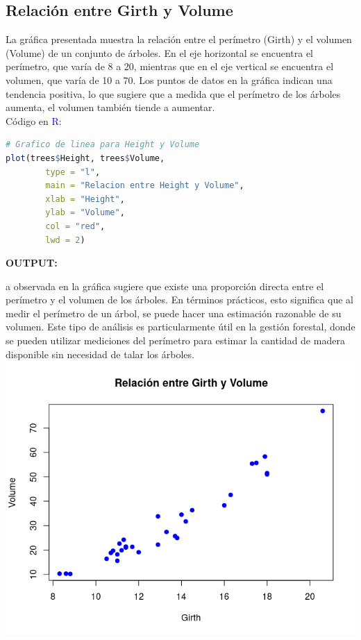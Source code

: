 \documentclass{article}
\begin{document}
\subsection{Relación entre Girth y Volume}
La gráfica presentada muestra la relación entre el perímetro (Girth) y el volumen (Volume) de un conjunto de árboles. En el eje horizontal se encuentra el perímetro, que varía de 8 a 20, mientras que en el eje vertical se encuentra el volumen, que varía de 10 a 70. Los puntos de datos en la gráfica indican una tendencia positiva, lo que sugiere que a medida que el perímetro de los árboles aumenta, el volumen también tiende a aumentar.\\
Código en \textcolor{blue}{R}:
\begin{lstlisting}[language=R, caption=Gráfico de Dispersión para la Relación entre Girth y Volume]
# Grafico de linea para Height y Volume
plot(trees$Height, trees$Volume,
        type = "l",
        main = "Relacion entre Height y Volume",
        xlab = "Height",
        ylab = "Volume",
        col = "red",
        lwd = 2)   
\end{lstlisting}
\textbf{\textbf{OUTPUT}:}
\begin{center} a observada en la gráfica sugiere que existe una proporción directa entre el perímetro y el volumen de los árboles. En términos prácticos, esto significa que al medir el perímetro de un árbol, se puede hacer una estimación razonable de su volumen. Este tipo de análisis es particularmente útil en la gestión forestal, donde se pueden utilizar mediciones del perímetro para estimar la cantidad de madera disponible sin necesidad de talar los árboles.
\includegraphics[width=1.0\textwidth]{code/Plots/dispersion.png}
\end{center}
\end{document}
